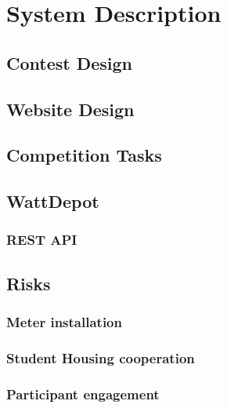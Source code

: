 \chapter{System Description}
\label{cha:system-description}

\section{Contest Design}

\section{Website Design}

\section{Competition Tasks}

\section{WattDepot}

\subsection{REST API}

\section{Risks}

\subsection{Meter installation}

\subsection{Student Housing cooperation}

\subsection{Participant engagement}
